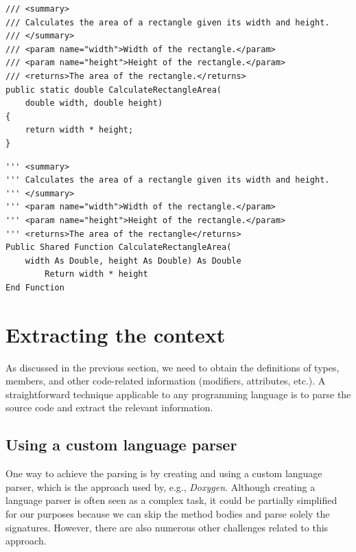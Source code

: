 \begin{listing}
\begin{lstlisting}
/// <summary>
/// Calculates the area of a rectangle given its width and height.
/// </summary>
/// <param name="width">Width of the rectangle.</param>
/// <param name="height">Height of the rectangle.</param>
/// <returns>The area of the rectangle.</returns>
public static double CalculateRectangleArea(
    double width, double height)
{
    return width * height;
}
\end{lstlisting}
\caption{Example of a C\# method with documentation}
\label{lst:ex-cs-xml}
\end{listing}

\begin{listing}
\begin{lstlisting}[language={[Visual]Basic}]
''' <summary>
''' Calculates the area of a rectangle given its width and height.
''' </summary>
''' <param name="width">Width of the rectangle.</param>
''' <param name="height">Height of the rectangle.</param>
''' <returns>The area of the rectangle</returns>
Public Shared Function CalculateRectangleArea(
    width As Double, height As Double) As Double
        Return width * height
End Function
\end{lstlisting}
\caption{Example of a VB.NET method with documentation}
\label{lst:ex-vb-xml}
\end{listing}

\section{Extracting the context}

As discussed in the previous section, we need to obtain the definitions of types, members, and other code-related information (modifiers, attributes, etc.).
A straightforward technique applicable to any programming language is to parse the source code and extract the relevant information.

\subsection*{Using a custom language parser}

One way to achieve the parsing is by creating and using a custom language parser, which is the approach used by, e.g., \textit{Doxygen}. 
Although creating a language parser is often seen as a complex task, it could be partially simplified for our purposes because we can skip the method bodies and parse solely the signatures.
However, there are also numerous other challenges related to this approach.

